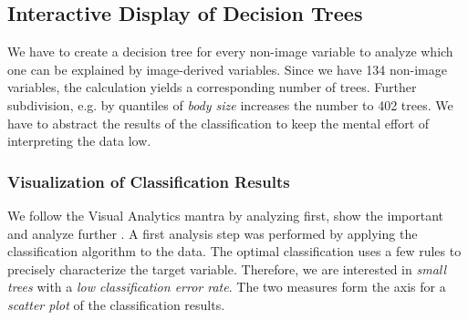\documentclass[a4paper,twoside]{style/article}
\begin{document}
\subsection{Interactive Display of Decision Trees}
We have to create a decision tree for every non-image variable to analyze which one can be explained by image-derived variables.
Since we have 134 non-image variables, the calculation yields a corresponding number of trees.
Further subdivision, e.g. by quantiles of \emph{body size} increases the number to 402 trees.
We have to abstract the results of the classification to keep the mental effort of interpreting the data low.
\subsubsection{Visualization of Classification Results}
\label{subsec:VisualizationOfClassificationResults}
We follow the Visual Analytics mantra by analyzing first, show the important and analyze further \cite{Keim}.
A first analysis step was performed by applying the classification algorithm to the data.
The optimal classification uses a few rules to precisely characterize the target variable.
Therefore, we are interested in \emph{small trees} with a \emph{low classification error rate}.
The two measures form the axis for a \emph{scatter plot} of the classification results.
\end{document}
